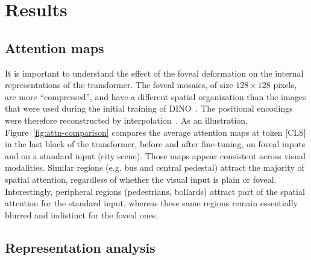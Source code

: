 \documentclass{article}
\begin{document}
\section{Results}

\subsection{Attention maps}
It is important to understand the effect of the foveal deformation on the internal representations of the transformer. The foveal mosaics, of size $128 \times 128$ pixels, are more ``compressed'', and have a different spatial organization than the images that were used during the initial training of DINO~\cite{caron2021emerging}. The positional encodings were therefore reconstructed by interpolation~\cite{dosovitskiy2021image}. As an illustration, Figure~\ref{fig:attn-comparison} compares the average attention maps at token [CLS] in the last block of the transformer, before and after fine-tuning, on foveal inputs and on a standard input (city scene). Those maps appear consistent across visual modalities. Similar regions (e.g. bus and central pedestal) attract the majority of spatial attention, regardless of whether the visual input is plain or foveal. Interestingly, peripheral regions (pedestrians, bollards) attract part of the spatial attention for the standard input, whereas these same regions remain essentially blurred and indistinct for the foveal ones.

\subsection{Representation analysis}
\end{document}
